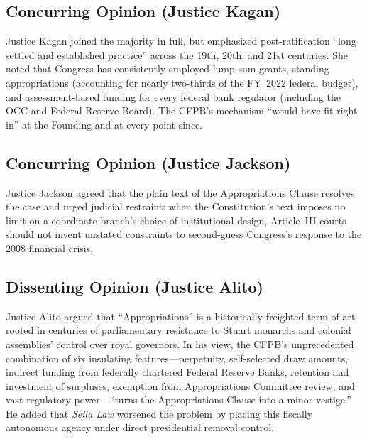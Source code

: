 \documentclass[12pt]{article}
\begin{document}
\subsection{Concurring Opinion (Justice Kagan)}

Justice Kagan joined the majority in full, but emphasized post-ratification ``long settled and established practice'' across the 19th, 20th, and 21st centuries. She noted that Congress has consistently employed lump-sum grants, standing appropriations (accounting for nearly two-thirds of the FY~2022 federal budget), and assessment-based funding for every federal bank regulator (including the OCC and Federal Reserve Board). The CFPB's mechanism ``would have fit right in'' at the Founding and at every point since.

\subsection{Concurring Opinion (Justice Jackson)}

Justice Jackson agreed that the plain text of the Appropriations Clause resolves the case and urged judicial restraint: when the Constitution's text imposes no limit on a coordinate branch's choice of institutional design, Article~III courts should not invent unstated constraints to second-guess Congress's response to the 2008 financial crisis.

\subsection{Dissenting Opinion (Justice Alito)}

Justice Alito argued that ``Appropriations'' is a historically freighted term of art rooted in centuries of parliamentary resistance to Stuart monarchs and colonial assemblies' control over royal governors. In his view, the CFPB's unprecedented combination of six insulating features---perpetuity, self-selected draw amounts, indirect funding from federally chartered Federal Reserve Banks, retention and investment of surpluses, exemption from Appropriations Committee review, and vast regulatory power---``turns the Appropriations Clause into a minor vestige.'' He added that \textit{Seila Law} worsened the problem by placing this fiscally autonomous agency under direct presidential removal control.
\end{document}
